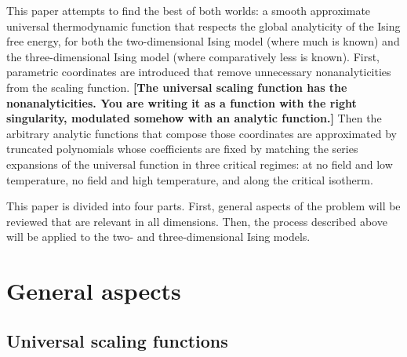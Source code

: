 \documentclass[
  aps,
  prb,
  reprint,
  longbibliography,
  floatfix
]{revtex4-2}
\begin{document}
This paper attempts to find the best of both worlds: a smooth approximate
universal thermodynamic function that respects the global analyticity of the
Ising free energy, for both the two-dimensional Ising model (where much is
known) and the three-dimensional Ising model (where comparatively less is
known). First, parametric coordinates are introduced that remove unnecessary
nonanalyticities from the scaling function. {\bf [The universal scaling function has the nonanalyticities. You are writing it as a function with the right singularity, modulated somehow with an analytic function.]} Then the arbitrary analytic
functions that compose those coordinates are approximated by truncated
polynomials whose coefficients are fixed by matching the series expansions of
the universal function in three critical regimes: at no field and low
temperature, no field and high temperature, and along the critical isotherm.

This paper is divided into four parts. First, general aspects of the problem
will be reviewed that are relevant in all dimensions. Then, the process
described above will be applied to the two- and three-dimensional Ising models.

\section{General aspects}

\subsection{Universal scaling functions}
\end{document}
